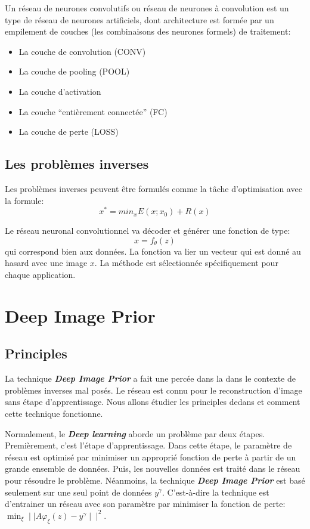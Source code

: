 \documentclass[
  11pt,
  dvipsnames]{article}
\providecommand{\tightlist}{%
  \setlength{\itemsep}{0pt}\setlength{\parskip}{0pt}}
\begin{document}
Un réseau de neurones convolutifs ou réseau de neurones à convolution
est un type de réseau de neurones artificiels, dont architecture est formée par
un empilement de couches (les combinaisons des neurones formels) de traitement:

\begin{itemize}
\tightlist
\item
  La couche de convolution (CONV)
\item
  La couche de pooling (POOL)
\item
  La couche d'activation
\item
  La couche ``entièrement connectée'' (FC)
\item
  La couche de perte (LOSS)
\end{itemize}

\hypertarget{les-probluxe8mes-inverses}{%
\subsection{Les problèmes inverses}\label{les-probluxe8mes-inverses}}

Les problèmes inverses peuvent être formulés comme la tâche d'optimisation avec la formule:
\[x^* = min_{x}E(x;x_{0}) + R(x)\]

Le réseau neuronal convolutionnel va décoder et générer une fonction de type:
\[x = f_{\theta}(z)\]
qui correspond bien aux données. La fonction va lier un vecteur qui est donné au hasard avec une image \(x\).
La méthode est sélectionnée spécifiquement pour chaque application.

\hypertarget{deep-image-prior}{%
\section{Deep Image Prior}\label{deep-image-prior}}

\hypertarget{principles}{%
\subsection{Principles}\label{principles}}

La technique \textbf{\emph{Deep Image Prior}} a fait une percée dans la dans le contexte
de problèmes inverses mal posés. Le réseau est connu pour le reconstruction d'image sans
étape d'apprentissage. Nous allons étudier les principles dedans et comment cette technique fonctionne.

Normalement, le \textbf{\emph{Deep learning}} aborde un problème par deux étapes. Premièrement, c'est l'étape d'apprentissage.
Dans cette étape, le paramètre de réseau est optimisé par minimiser un approprié fonction de perte à partir de
un grande ensemble de données. Puis, les nouvelles données est traité dans le réseau pour résoudre le problème.
Néanmoins, la technique \textbf{\emph{Deep Image Prior}} est basé seulement sur une seul point de données \(y^\gamma\). C'est-à-dire
la technique est d'entrainer un réseau avec son paramètre par minimiser la fonction de perte: \(\min_{\xi} \mid\mid A\varphi_\xi(z) - y^\gamma \mid\mid^2\).
\end{document}
